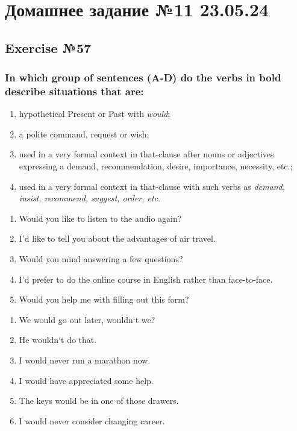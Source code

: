 \chapter{Домашнее задание №11 23.05.24}

\section{Exercise №57}
\subsection*{In which group of sentences (A-D) do the verbs in bold describe situations that are:}
\begin{enumerate}
      \item hypothetical Present or Past with \textit{would};
      \item a polite command, request or wish;
      \item used in a very formal context in that-clause after nouns or adjectives expressing a demand, recommendation, desire, importance, necessity, etc.;
      \item used in a very formal context in that-clause with such verbs as \textit{demand, insist, recommend, suggest, order, etc}.
\end{enumerate}

\begin{enumerate}
      \item Would you like to listen to the audio again?
      \item I’d like to tell you about the advantages of air travel.
      \item Would you mind answering a few questions?
      \item I’d prefer to do the online course in English rather than face-to-face.
      \item Would you help me with filling out this form?
\end{enumerate}

\begin{enumerate}
      \item We would go out later, wouldn`t we?
      \item He wouldn`t do that.
      \item I would never run a marathon now.
      \item I would have appreciated some help.
      \item The keys would be in one of those drawers.
      \item I would never consider changing career.
\end{enumerate}

